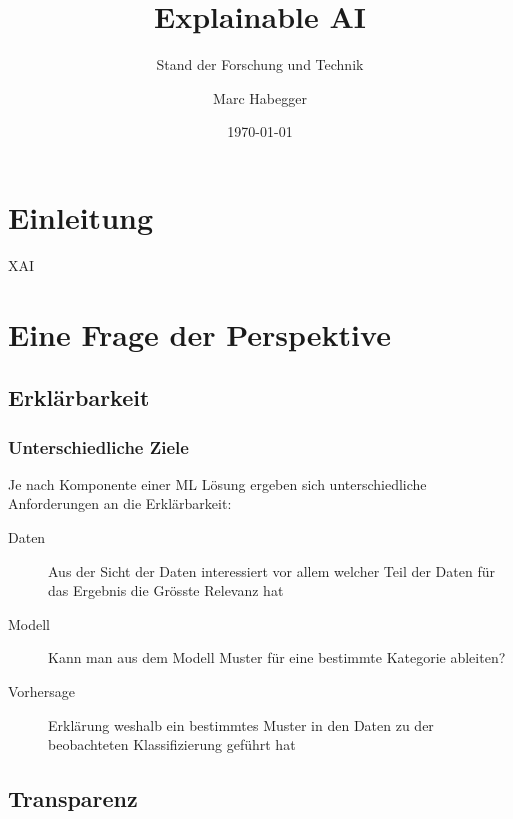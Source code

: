 \documentclass[
  12pt, %
  a4paper, %
  oneside, %
  openany, 
  numbers=noenddot, %
  BCOR=5mm, %
  parskip=half*, %
  thesis, %
]{bfhbook}
\author{Marc Habegger}
\title{Explainable AI}
\subtitle{Stand der Forschung und Technik}
\date{\today} %
\begin{document}
                         
\maketitle

\tableofcontents
\sloppy
\mainmatter %

\chapter{Einleitung}
\Gls{XAI}
\chapter{Eine Frage der Perspektive}
\section{Erklärbarkeit}
\subsection{Unterschiedliche Ziele}
Je nach Komponente einer ML Lösung ergeben sich unterschiedliche Anforderungen an die Erklärbarkeit: \cite{XAI2018}

\begin{description}
\item[Daten]
Aus der Sicht der Daten interessiert vor allem welcher Teil der Daten für das Ergebnis die Grösste Relevanz hat

\item[Modell]
Kann man aus dem Modell Muster für eine bestimmte Kategorie ableiten?

\item[Vorhersage]
Erklärung weshalb ein bestimmtes Muster in den Daten zu der beobachteten Klassifizierung geführt hat
\end{description}

\section{Transparenz}
\end{document}

